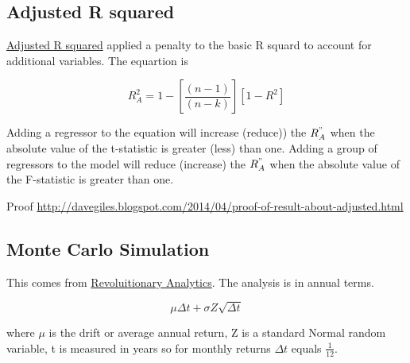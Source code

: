 \documentclass[12pt, a4paper, oneside]{article}\usepackage[]{graphicx}\usepackage[]{color}
\begin{document}
\subsection{Adjusted R squared}
\href{http://davegiles.blogspot.ca/2013/05/when-will-adjusted-r-squared-increase.html}{Adjusted R squared} applied a penalty to the basic R squard to account for additional variables.  The equartion is 

\begin{equation}
R_A^2 = 1 - \left [ \frac{(n-1)}{(n-k)} \right ] [1 - R^2]
\end{equation}

Adding a regressor to the equation will increase (reduce)) the $R_A^"$ when the absolute value of the t-statistic is greater (less) than one. Adding a group of regressors to the model will reduce (increase) the $R_A^"$ when the absolute value of the F-statistic is greater than one.  

Proof \href{http://davegiles.blogspot.com/2014/04/proof-of-result-about-adjusted.html}{http://davegiles.blogspot.com/2014/04/proof-of-result-about-adjusted.html}

\subsection{Monte Carlo Simulation}
This comes from \href{http://blog.revolutionanalytics.com/2014/04/quantitative-finance-applications-in-r-5.html}{Revoluitionary Analytics}.  The analysis is in annual terms.  

\begin{equation}
\mu \Delta t + \sigma Z \sqrt{\Delta t}
\end{equation}

where $\mu$ is the drift or average annual return, Z is a standard Normal random variable, t is measured in years so for monthly returns $\Delta t$ equals $\frac{1}{12}$.
\end{document}
